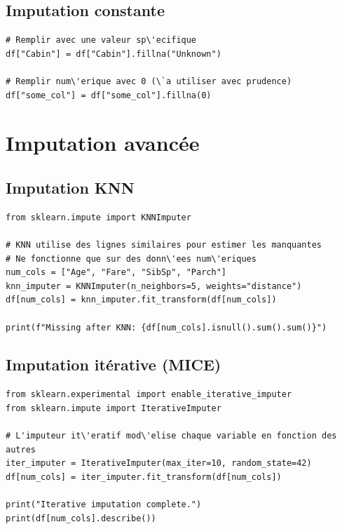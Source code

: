 \subsection{Imputation constante}

\begin{verbatim}
# Remplir avec une valeur sp\'ecifique
df["Cabin"] = df["Cabin"].fillna("Unknown")

# Remplir num\'erique avec 0 (\`a utiliser avec prudence)
df["some_col"] = df["some_col"].fillna(0)
\end{verbatim}

\section{Imputation avanc\'ee}

\subsection{Imputation KNN}

\begin{verbatim}
from sklearn.impute import KNNImputer

# KNN utilise des lignes similaires pour estimer les manquantes
# Ne fonctionne que sur des donn\'ees num\'eriques
num_cols = ["Age", "Fare", "SibSp", "Parch"]
knn_imputer = KNNImputer(n_neighbors=5, weights="distance")
df[num_cols] = knn_imputer.fit_transform(df[num_cols])

print(f"Missing after KNN: {df[num_cols].isnull().sum().sum()}")
\end{verbatim}

\subsection{Imputation it\'erative (MICE)}

\begin{verbatim}
from sklearn.experimental import enable_iterative_imputer
from sklearn.impute import IterativeImputer

# L'imputeur it\'eratif mod\'elise chaque variable en fonction des autres
iter_imputer = IterativeImputer(max_iter=10, random_state=42)
df[num_cols] = iter_imputer.fit_transform(df[num_cols])

print("Iterative imputation complete.")
print(df[num_cols].describe())
\end{verbatim}

